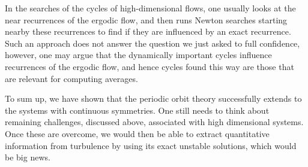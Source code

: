 In the searches of the cycles of high-dimensional flows, one usually looks at
the near recurrences of the ergodic flow, and then runs Newton searches
starting nearby these recurrences to find if they are influenced by an exact
recurrence. Such an approach does not answer the question we just asked to full
confidence, however, one may argue that the dynamically important cycles
influence recurrences of the ergodic flow, and hence cycles found this way are
those that are relevant for computing averages.

To sum up, we have shown that the periodic orbit theory successfully extends to
the systems with continuous symmetries. One still needs to think about
remaining challenges, discussed above, associated with high dimensional systems. 
Once these are overcome, we would then be able to extract quantitative information 
from turbulence by using its exact unstable solutions, which would be big news.